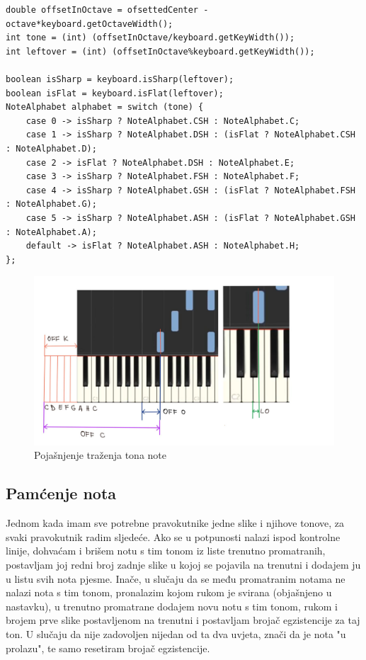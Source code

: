 \documentclass[times, utf8, zavrsni, numeric]{fer}
\begin{document}
\begin{lstlisting}
double offsetInOctave = ofsettedCenter - octave*keyboard.getOctaveWidth();
int tone = (int) (offsetInOctave/keyboard.getKeyWidth());
int leftover = (int) (offsetInOctave%keyboard.getKeyWidth());

boolean isSharp = keyboard.isSharp(leftover);
boolean isFlat = keyboard.isFlat(leftover);
NoteAlphabet alphabet = switch (tone) {
	case 0 -> isSharp ? NoteAlphabet.CSH : NoteAlphabet.C;
	case 1 -> isSharp ? NoteAlphabet.DSH : (isFlat ? NoteAlphabet.CSH : NoteAlphabet.D);
	case 2 -> isFlat ? NoteAlphabet.DSH : NoteAlphabet.E;
	case 3 -> isSharp ? NoteAlphabet.FSH : NoteAlphabet.F;
	case 4 -> isSharp ? NoteAlphabet.GSH : (isFlat ? NoteAlphabet.FSH : NoteAlphabet.G);
	case 5 -> isSharp ? NoteAlphabet.ASH : (isFlat ? NoteAlphabet.GSH : NoteAlphabet.A);
	default -> isFlat ? NoteAlphabet.ASH : NoteAlphabet.H;
};
\end{lstlisting}

\begin{figure}[h]
	\includegraphics[scale=0.24]{pitchFind.jpg}
	\centering
	\caption{Pojašnjenje traženja tona note}
	\label{fig:pitchFind}
\end{figure}

\subsection{Pamćenje nota}
Jednom kada imam sve potrebne pravokutnike jedne slike i njihove tonove, za svaki pravokutnik radim sljedeće. Ako se u potpunosti nalazi ispod kontrolne linije, dohvaćam i brišem notu s tim tonom iz liste trenutno promatranih, postavljam joj redni broj zadnje slike u kojoj se pojavila na trenutni i dodajem ju u listu svih nota pjesme. Inače, u slučaju da se među promatranim notama ne nalazi nota s tim tonom, pronalazim kojom rukom je svirana (objašnjeno u nastavku), u trenutno promatrane dodajem novu notu s tim tonom, rukom i brojem prve slike postavljenom na trenutni i postavljam brojač egzistencije za taj ton. U slučaju da nije zadovoljen nijedan od ta dva uvjeta, znači da je nota "u prolazu", te samo resetiram brojač egzistencije.
\end{document}
